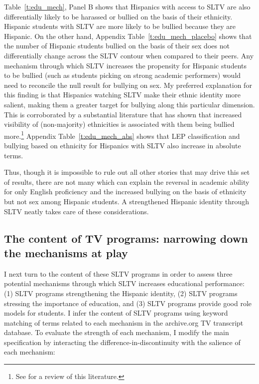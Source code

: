 \documentclass[11pt]{article}
\begin{document}
Table~\ref{t:edu_mech}, Panel B shows that Hispanics with access to SLTV are also differentially likely to be harassed or bullied on the basis of their ethnicity. Hispanic students with SLTV are more likely to be bullied because they are Hispanic. On the other hand, Appendix Table~\ref{t:edu_mech_placebo} shows that the number of Hispanic students bullied on the basis of their sex does not differentially change across the SLTV contour when compared to their peers. Any mechanism through which SLTV increases the propensity for Hispanic students to be bullied (such as students picking on strong academic performers) would need to reconcile the null result for bullying on sex. My preferred explanation for this finding is that Hispanics watching SLTV make their ethnic identity more salient, making them a greater target for bullying along this particular dimension. This is corroborated by a substantial literature that has shown that increased visibility of (non-majority) ethnicities is associated with them being bullied more.\footnote{ See \cite{scherr_bullying_2009} for a review of this literature.} Appendix Table~\ref{t:edu_mech_abs} shows that LEP classification and bullying based on ethnicity for Hispanics with SLTV also increase in absolute terms. 

Thus, though it is impossible to rule out all other stories that may drive this set of results, there are not many which can explain the reversal in academic ability for only English proficiency and the increased bullying on the basis of ethnicity but not sex among Hispanic students. A strengthened Hispanic identity through SLTV neatly takes care of these considerations.


\subsection{The content of TV programs: narrowing down the mechanisms at play} \label{s:transcripts}

I next turn to the content of these SLTV programs in order to assess three potential mechanisms through which SLTV increases educational performance: (1) SLTV programs strengthening the Hispanic identity, (2) SLTV programs stressing the importance of education, and (3) SLTV programs provide good role models for students. I infer the content of SLTV programs using keyword matching of terms related to each mechanism in the archive.org TV transcript database. To evaluate the strength of each mechanism, I modify the main specification by interacting the difference-in-discontinuity with the salience of each mechanism:
\end{document}

